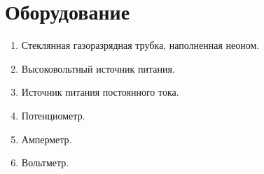 \section*{Оборудование}

\begin{enumerate}
	\item Стеклянная газоразрядная трубка, наполненная неоном.
	
	\item Высоковольтный источник питания.
	
	\item Источник питания постоянного тока.
	
	\item Потенциометр.
	
	\item Амперметр.
	
	\item Вольтметр.
\end{enumerate}